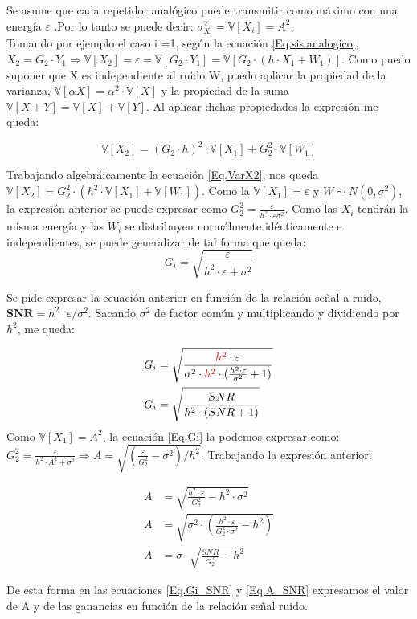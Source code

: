 \indent Se asume que cada repetidor analógico puede transmitir como máximo con una energía $\varepsilon$ .Por lo tanto se puede decir: $\sigma _{X_i}^{2} = \mathbb{V}[X_i] = A^2$. \\
\indent Tomando por ejemplo el caso i =1, según la ecuación \ref{Eq.sis.analogico}, $X_2 = G_2 \cdot Y_1  \Rightarrow \mathbb{V}[X_2] = \varepsilon = \mathbb{V}[G_2 \cdot Y_1] = \mathbb{V}[G_2 \cdot (h \cdot X_1 + W_1)]$. Como puedo suponer que X es independiente al ruido W, puedo aplicar la propiedad de la varianza, $\mathbb{V}[\alpha X]= \alpha^2 \cdot \mathbb{V}[X]$ y la propiedad de la suma $\mathbb{V}[X+Y] = \mathbb{V}[X]+ \mathbb{V}[Y]$. Al aplicar dichas propiedades la expresión me queda:

				\begin{equation}
					\mathbb{V}[X_2] =(G_2 \cdot h)^2 \cdot \mathbb{V} [X_1] + G_2^2 \cdot \mathbb{V}[ W_1]
				\label{Eq.VarX2}
				\end{equation}  
	
\indent Trabajando algebráicamente la ecuación \ref{Eq.VarX2}, nos queda $\mathbb{V}[X_2] = G_2^2 \cdot (h^2 \cdot \mathbb{V}[X_1] + \mathbb{V}[W_1])$. Como la $\mathbb{V}[X_1] = \varepsilon$ y $W \sim N(0,\sigma ^2)$, la expresión anterior se puede expresar como $G_2^2 = \frac{\varepsilon}{h^2 \cdot \varepsilon \sigma ^2}$. Como las $X_i$ tendrán la misma energía y las $W_i$ se distribuyen normálmente idénticamente e independientes, se puede generalizar de tal forma que queda:
				\begin{equation}
					G_i = \sqrt{\frac{\varepsilon}{h^2 \cdot \varepsilon + \sigma ^2}}
				\label{Eq.Gi}
				\end{equation}

Se pide expresar la ecuación anterior en función de la relación señal a ruido, $\textbf{SNR} = h^2 \cdot \varepsilon / \sigma ^2$. Sacando $\sigma ^2$ de factor común y multiplicando y dividiendo por $h^2$, me queda:
			
				\begin{align}
					G_i &= \sqrt{\frac{\textcolor{red}{h^2} \cdot \varepsilon}{\sigma ^2 \cdot \textcolor{red}{h^2} \cdot (\frac{h^2 \cdot \varepsilon}{\sigma ^2} + 1)}} \\
					G_i &= \sqrt{\frac{SNR}{h^2 \cdot (SNR + 1)}}
					\label{Eq.Gi_SNR}
				\end{align}
Como $\mathbb{V}[X_1] = A^2$, la ecuación \ref{Eq.Gi} la podemos expresar como: $G_2 ^2 = \frac{\varepsilon}{h^2 \cdot A^2 + \sigma ^2} \Rightarrow A = \sqrt{(\frac{\varepsilon}{G_2^2}-\sigma ^2)/h^2}$. Trabajando la expresión anterior:

				\begin{align}
					A &= \sqrt{\frac{h^2 \cdot \varepsilon}{G_2^2}- h^2 \cdot \sigma ^2} \\	
					A &= \sqrt{\sigma ^2 \cdot (\frac{h^2 \cdot \varepsilon}{G_2^2 \cdot \sigma ^2}- h^2)} \\
					A &= \sigma \cdot \sqrt{\frac{SNR}{G_2^2}-h^2}
					\label{Eq.A_SNR}
				\end{align}
			
\indent De esta forma en las ecuaciones \ref{Eq.Gi_SNR} y \ref{Eq.A_SNR} expresamos el valor de A y de las ganancias en función de la relación señal ruido.
